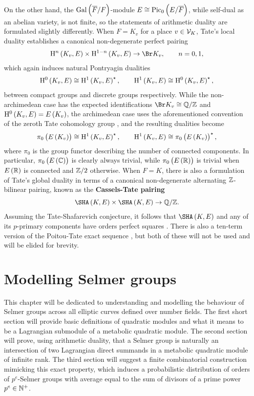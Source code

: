On the other hand, the $ \AG{F} $-module $ E \cong \Pic $, while self-dual as an abelian variety, is not finite, so the statements of arithmetic duality are formulated slightly differently. When $ F = K_v $ for a place $ v \in \mathcal{V}_K $, Tate's local duality establishes a canonical non-degenerate perfect pairing \cite[Corollary I.3.4]{Mil06}
$$ \H^n\br{K_v, E} \times \H^{1 - n}\br{K_v, E} \to \Br K_v, \qquad n = 0, 1, $$
which again induces natural Pontryagin dualities
$$ \H^0\br{K_v, E} \cong \HE{K_v}^\star, \qquad \HE{K_v} \cong \H^0\br{K_v, E}^\star, $$
between compact groups and discrete groups respectively. While the non-archimedean case has the expected identifications $ \Br K_v \cong \QQ / \ZZ $ and $ \H^0\br{K_v, E} = E\br{K_v} $, the archimedean case uses the aforementioned convention of the zeroth Tate cohomology group \cite[Remark I.3.7]{Mil06}, and the resulting dualities become
$$ \pi_0\br{E\br{K_v}} \cong \HE{K_v}^\star, \qquad \HE{K_v} \cong \pi_0\br{E\br{K_v}}^\star, $$
where $ \pi_0 $ is the group functor describing the number of connected components. In particular, $ \pi_0\br{E\br{\CC}} $ is clearly always trivial, while $ \pi_0\br{E\br{\RR}} $ is trivial when $ E\br{\RR} $ is connected and $ \mathbb{Z} / 2 $ otherwise. When $ F = K $, there is also a formulation of Tate's global duality \cite[Theorem I.6.13]{Mil06} in terms of a canonical non-degenerate alternating $ \mathbb{Z} $-bilinear pairing, known as the \textbf{Cassels-Tate pairing}
$$ \Sha \times \Sha \to \QQ / \ZZ. $$
Assuming the Tate-Shafarevich conjecture, it follows that $ \Sha $ and any of its $ p $-primary components have orders perfect squares \cite[Theorem X.4.14]{Sil09}. There is also a ten-term version of the Poitou-Tate exact sequence \cite[Remark I.6.14]{Mil06}, but both of these will not be used and will be elided for brevity.

\pagebreak

\chapter{Modelling Selmer groups}

This chapter will be dedicated to understanding and modelling the behaviour of Selmer groups across all elliptic curves defined over number fields. The first short section will provide basic definitions of quadratic modules and what it means to be a Lagrangian submodule of a metabolic quadratic module. The second section will prove, using arithmetic duality, that a Selmer group is naturally an intersection of two Lagrangian direct summands in a metabolic quadratic module of infinite rank. The third section will suggest a finite combinatorial construction mimicking this exact property, which induces a probabilistic distribution of orders of $ p^e $-Selmer groups with average equal to the sum of divisors of a prime power $ p^e \in \mathbb{N}^+ $.

